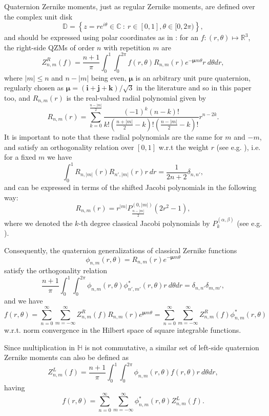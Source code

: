 \documentclass[12pt]{article}
\newcommand{\R}{\mathbb{R}}
\newcommand{\C}{\mathbb{C}}
\newcommand{\Hq}{\mathbb{H}}
\newcommand{\D}{\mathbb{D}}
\newcommand{\qi}{\textbf{i}}
\newcommand{\qj}{\textbf{j}}
\newcommand{\qk}{\textbf{k}}
\newcommand{\qmu}{\boldsymbol{\mu}}
\begin{document}
Quaternion Zernike moments, just as regular Zernike moments, are defined over the complex unit disk
\[
	\D = \left\{ z = re^{i\theta}\in\C \ :\ r\in[0,1],\theta\in[0,2\pi)\right\},
\]
and should be expressed using polar coordinates as in \cite{ChenOriginal}: for an $f: (r,\theta)\mapsto\R^3$, the right-side QZMs of order $n$ with repetition $m$ are
\begin{equation}\label{QZRM}
	Z_{n,m}^R (f) = \frac{n+1}{\pi} \int_0^1 \int_0^{2\pi} f(r,\theta) R_{n,m}(r) e^{-\qmu m\theta} r \ d\theta dr,
\end{equation}
where $|m|\leq n$ and $n-|m|$ being even, $\qmu$ is an arbitrary unit pure quaternion, regularly chosen as $\qmu = (\qi+\qj+\qk)/\sqrt{3}$ in the literature and so in this paper too, and $R_{n,m}(r)$ is the real-valued radial polynomial given by
\[
	R_{n,m}(r) = \sum_{k=0}^{\frac{n - |m|}{2}}\frac{(-1)^k (n - k)!}{k!\left(\frac{n + |m|}{2} - k\right)!\left(\frac{n - |m|}{2} - k\right)!}r^{n-2k}.
\]
It is important to note that these radial polynomials are the same for $m$ and $-m$, and satisfy an orthogonality relation over $[0,1]$ w.r.t the weight $r$ (see e.g. \cite{PapSchipp}), i.e. for a fixed $m$ we have
\begin{equation}\label{Rortho}
	\int_0^1 R_{n,|m|}(r) R_{n',|m|}(r)r\ dr  = \frac{1}{2n+2} \delta_{n,n'},
\end{equation}
and can be expressed in terms of the shifted Jacobi polynomials in the following way:
\begin{equation}\label{RJacobi}
	R_{n,m}(r) = r^{|m|} P_{\frac{n - |m|}{2}}^{(0,|m|)}(2r^2-1),
\end{equation}
where we denoted the $k$-th degree classical Jacobi polynomials by $P_k^{(\alpha,\beta)}$ (see e.g. \cite{Szego}).

Consequently, the quaternion generalizations of classical Zernike functions
\[
	\phi_{n,m}(r,\theta) = R_{n,m}(r) e^{-\qmu m\theta}
\]
satisfy the orthogonality relation
\begin{equation}\label{QZortho}
	\frac{n+1}{\pi} \int_0^1 \int_0^{2\pi} \phi_{n,m}(r,\theta) \phi^*_{n',m'}(r,\theta) r \ d\theta dr = \delta_{n,n'}\delta_{m,m'},
\end{equation}
and we have
\[
	f(r,\theta) = \sum_{n=0}^{\infty}\sum_{m=-\infty}^{\infty} Z_{n,m}^R(f) R_{n,m}(r)e^{\qmu m\theta} =
		\sum_{n=0}^{\infty}\sum_{m=-\infty}^{\infty} Z_{n,m}^R(f) \phi^*_{n,m}(r,\theta)
\]
w.r.t. norm convergence in the Hilbert space of square integrable functions.

Since multiplication in $\Hq$ is not commutative, a similar set of left-side quaternion Zernike moments can also be defined as
\begin{equation}\label{QZLM}
	Z_{n,m}^L(f) = \frac{n + 1}{\pi}\int_0^1\int_0^{2\pi} \phi_{n,m}(r,\theta) f(r,\theta)r \ d\theta dr,
\end{equation}
having
\[
	f(r,\theta) = \sum_{n=0}^{\infty}\sum_{m=-\infty}^{\infty} \phi^*_{n,m}(r,\theta) Z_{n,m}^L(f).
\]
\end{document}
